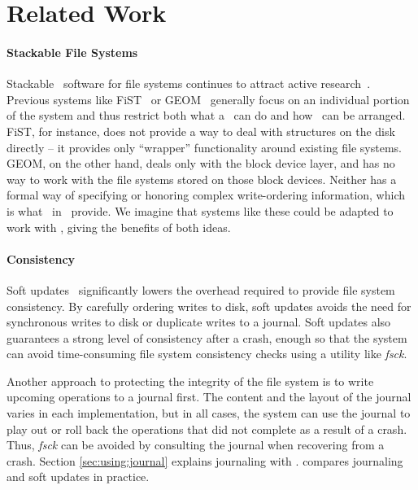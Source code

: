 \section{Related Work}
\label{sec:related}

\paragraph{Stackable File Systems}


Stackable \module\ software for file systems continues to attract active
research~\cite{rosenthal90evolving, heidemann91layered, skinner93stacking,
heidemann94filesystem,zadok99extending,
zadok00fist,wright01ncryptfs,wright06versatility}. Previous
systems like FiST~\cite{zadok00fist} or GEOM~\cite{geom} generally focus on
an individual portion of the system and thus restrict both what a \module\
can do and how \modules\ can be arranged. FiST, for instance, does not
provide a way to deal with structures on the disk directly -- it provides
only ``wrapper'' functionality around existing file
systems. %
GEOM, on the other hand, deals only with the block device layer, and has no
way to work with the file systems stored on those block devices. Neither
has a formal way of specifying or honoring complex write-ordering
information, which is what \chdescs\ in \Kudos\ provide. We imagine that
systems like these could be adapted to work with \chdescs, giving the
benefits of both ideas.

\paragraph{Consistency}

Soft updates~\cite{ganger00soft} 
significantly lowers the overhead required to provide file system
consistency. By carefully ordering writes to disk, soft updates avoids the need
for synchronous writes to disk or duplicate writes to a journal. Soft updates
also guarantees a strong level of consistency after a crash, enough so that the
system can avoid time-consuming file system consistency checks using a utility
like \emph{fsck}. 


Another approach to protecting the integrity of the file system is to write
upcoming operations to a journal first. The content and the layout of the
journal varies in each implementation, but in all cases, the system can use
the journal to play out or roll back the operations that did not complete
as a result of a crash. Thus, \emph{fsck} can be avoided by consulting the
journal when recovering from a crash. Section \ref{sec:using:journal}
explains journaling with \chdescs. \cite{seltzer00journaling} compares
journaling and soft updates in practice.

